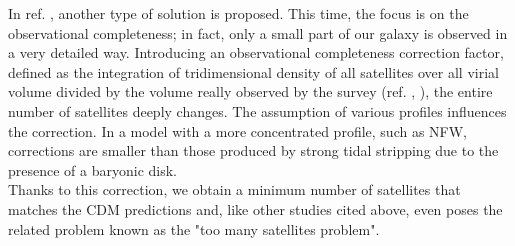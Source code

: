 In ref. \cite{There_is_No_Missing_Satellites_Problem}, another type of solution is proposed. This time, the focus is on the observational completeness; in fact, only a small part of our galaxy is observed in a very detailed way.
Introducing an observational completeness correction factor, defined as the integration of tridimensional density of all satellites over all virial volume divided by the volume really observed by the survey (ref. \cite{The_Luminosity_Function_of_the_Milky_Way_Satellites_2008}, \cite{THE_INVISIBLES:_A_DETECTION_ALGORITHM_TO_TRACE_THE_FAINTEST_MILKY_WAY_SATELLITES_2008}), the entire number of satellites deeply changes. The assumption of various profiles influences the correction. In a model with a more concentrated profile, such as NFW, corrections are smaller than those produced by strong tidal stripping due to the presence of a baryonic disk.\\ Thanks to this correction, we obtain a minimum number of satellites that matches the CDM predictions and, like other studies cited above, even poses the related problem known as the "too many satellites problem".